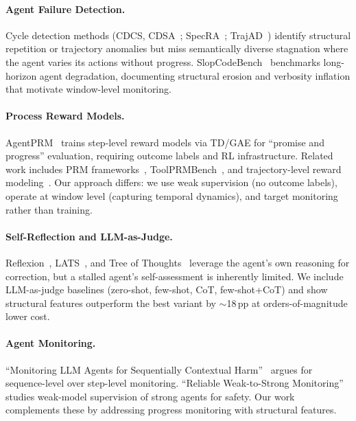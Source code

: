 \documentclass[11pt,a4paper]{article}
\begin{document}
\paragraph{Agent Failure Detection.}
Cycle detection methods (CDCS, CDSA~\cite{cdcs2024}; SpecRA~\cite{specra2025}; TrajAD~\cite{trajad2025}) identify structural repetition or trajectory anomalies but miss semantically diverse stagnation where the agent varies its actions without progress.
SlopCodeBench~\cite{slopcodebench2026} benchmarks long-horizon agent degradation, documenting structural erosion and verbosity inflation that motivate window-level monitoring.

\paragraph{Process Reward Models.}
AgentPRM~\cite{agentprm2026} trains step-level reward models via TD/GAE for ``promise and progress'' evaluation, requiring outcome labels and RL infrastructure.
Related work includes PRM frameworks~\cite{prm_framework2025}, ToolPRMBench~\cite{toolprmbench2026}, and trajectory-level reward modeling~\cite{traj_reward2026}.
Our approach differs: we use weak supervision (no outcome labels), operate at window level (capturing temporal dynamics), and target monitoring rather than training.

\paragraph{Self-Reflection and LLM-as-Judge.}
Reflexion~\cite{reflexion2023}, LATS~\cite{lats2024}, and Tree of Thoughts~\cite{tot2024} leverage the agent's own reasoning for correction, but a stalled agent's self-assessment is inherently limited.
We include LLM-as-judge baselines (zero-shot, few-shot, CoT, few-shot+CoT) and show structural features outperform the best variant by ${\sim}$18\,pp at orders-of-magnitude lower cost.

\paragraph{Agent Monitoring.}
``Monitoring LLM Agents for Sequentially Contextual Harm''~\cite{seq_monitoring2025} argues for sequence-level over step-level monitoring.
``Reliable Weak-to-Strong Monitoring''~\cite{weak_strong2025} studies weak-model supervision of strong agents for safety.
Our work complements these by addressing progress monitoring with structural features.
\end{document}
